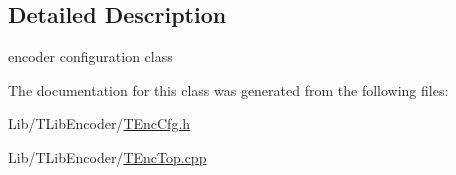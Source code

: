 \subsection{Detailed Description}
encoder configuration class 

The documentation for this class was generated from the following files\+:\begin{DoxyCompactItemize}
\item 
Lib/\+T\+Lib\+Encoder/\hyperlink{_t_enc_cfg_8h}{T\+Enc\+Cfg.\+h}\item 
Lib/\+T\+Lib\+Encoder/\hyperlink{_t_enc_top_8cpp}{T\+Enc\+Top.\+cpp}\end{DoxyCompactItemize}
